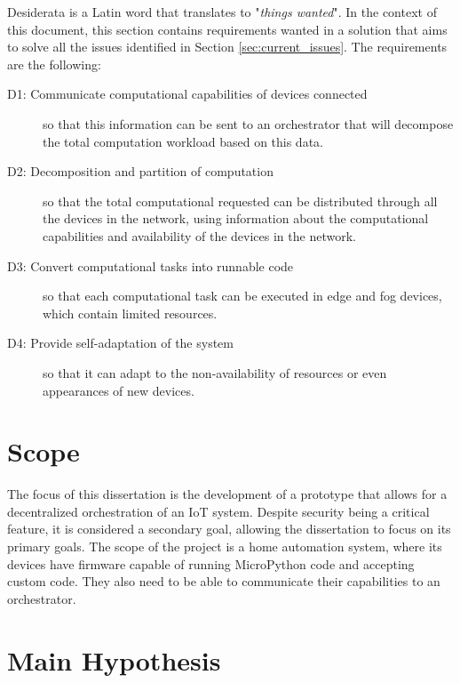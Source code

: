 Desiderata is a Latin word that translates to "\emph{things wanted}". In the context of this document, this section contains requirements wanted in a solution that aims to solve all the issues identified in Section \ref{sec:current_issues}. The requirements are the following:

\begin{description}
    \item [D1: Communicate computational capabilities of devices connected] so that this information can be sent to an orchestrator that will decompose the total computation workload based on this data.
    \item [D2: Decomposition and partition of computation] so that the total computational requested can be distributed through all the devices in the network, using information about the computational capabilities and availability of the devices in the network.
    \item [D3: Convert computational tasks into runnable code] so that each computational task can be executed in edge and fog devices, which contain limited resources.
    \item [D4: Provide self-adaptation of the system] so that it can adapt to the non-availability of resources or even appearances of new devices.
\end{description}

\section{Scope}\label{sec:scope}

The focus of this dissertation is the development of a prototype that allows for a decentralized orchestration of an IoT system. Despite security being a critical feature, it is considered a secondary goal, allowing the dissertation to focus on its primary goals. The scope of the project is a home automation system, where its devices have firmware capable of running  MicroPython code and accepting custom code. They also need to be able to communicate their capabilities to an orchestrator.


\section{Main Hypothesis}\label{sec:main_hypothesis}

